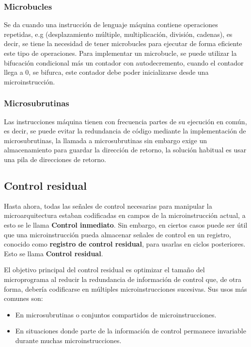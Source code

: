 \subsubsection*{Microbucles}
Se da cuando una instrucción de lenguaje máquina contiene operaciones repetidas, e.g (desplazamiento múltiple, multiplicación, división, cadenas), es decir, 
se tiene la necesidad de tener microbucles para ejecutar de forma eficiente este tipo de operaciones. Para implementar un microbucle,
se puede utilizar la bifucación condicional más un contador con autodecremento, cuando el contador llega a 0, se bifurca, este contador debe poder inicializarse desde una microinstrucción.
\subsubsection*{Microsubrutinas}
Las instrucciones máquina tienen con frecuencia partes de su ejecución en común, es decir, se puede evitar la redundancia de código mediante la implementación de microsubrutinas,
la llamada a microsubrutinas sin embargo exige un almacenamiento para guardar la dirección de retorno, la solución habitual es usar una pila de direcciones de retorno.


\subsection{Control residual}
Hasta ahora, todas las señales de control necesarias para manipular la microarquitectura estaban codificadas en campos de la microinstrucción actual, a esto se le llama \textbf{Control inmediato}. Sin embargo, en ciertos casos puede ser útil que una microinstrucción pueda almacenar señales de control en un registro, conocido como \textbf{registro de control residual}, para usarlas en ciclos posteriores. Esto se llama \textbf{Control residual}.

El objetivo principal del control residual es optimizar el tamaño del microprograma al reducir la redundancia de información de control que, de otra forma, debería codificarse en múltiples microinstrucciones sucesivas. Sus usos más comunes son:

\begin{itemize}
    \item En microsubrutinas o conjuntos compartidos de microinstrucciones.
    \item En situaciones donde parte de la información de control permanece invariable durante muchas microinstrucciones.
\end{itemize}

